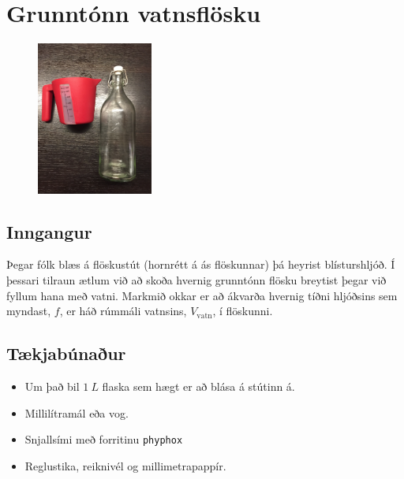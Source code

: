 \documentclass[oneside]{book}
\theoremstyle{definition}
\begin{document}
\newpage

\section{Grunntónn vatnsflösku}

\begin{minipage}{\linewidth}

\begin{figure}
\vspace{-1cm}
\includegraphics[width = 1.5in]{figures/hell.png}
\end{figure}

\subsection*{Inngangur}

Þegar fólk blæs á flöskustút (hornrétt á ás flöskunnar) þá heyrist blísturshljóð. Í þessari tilraun ætlum við að skoða hvernig grunntónn flösku breytist þegar við fyllum hana með vatni. Markmið okkar er að ákvarða hvernig tíðni hljóðsins sem myndast, $f$, er háð rúmmáli vatnsins, $V_{\text{vatn}}$, í flöskunni.

\subsection*{Tækjabúnaður}

\begin{itemize}
    
    \item Um það bil $\SI{1}{L}$ flaska sem hægt er að blása á stútinn á.
    
    \item Millilítramál eða vog.
    
    \item Snjallsími með forritinu \verb|phyphox|
    
    \item Reglustika, reiknivél og millimetrapappír.
\end{itemize}

\end{minipage}
\end{document}
